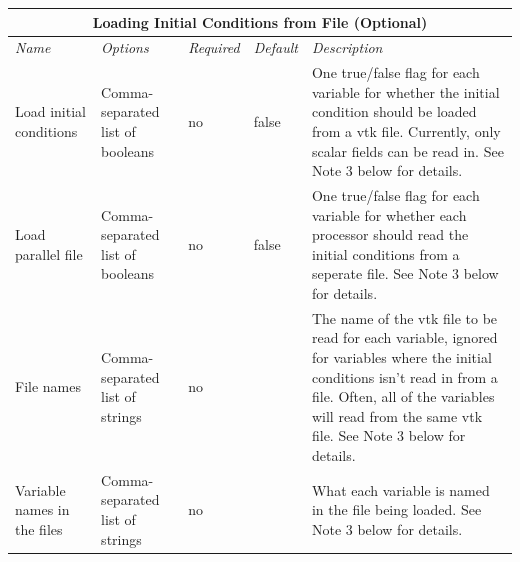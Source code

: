 \documentclass[10pt]{article} %
\begin{document}
\begin{center}
    \begin{tabular}{ | p{} | p{} | p{} | p{} | p{} |}
    \hline
      \multicolumn{5}{|c|}{\textbf{Loading Initial Conditions from File (Optional)}} \\
    \hline
    \hline
    \emph{Name} & \emph{Options} & \emph{Required} & \emph{Default} & \emph{Description} \\ \hline
    Load initial conditions & Comma-separated list of booleans & no & false & One true/false flag for each variable for whether the initial condition should be loaded from a vtk file. Currently, only scalar fields can be read in. See Note 3 below for details. \\ \hline
     Load parallel file & Comma-separated list of booleans & no & false & One true/false flag for each variable for whether each processor should read the initial conditions from a seperate file. See Note 3 below for details.  \\ \hline
      File names & Comma-separated list of strings & no &  & The name of the vtk file to be read for each variable, ignored for variables where the initial conditions isn't read in from a file. Often, all of the variables will read from the same vtk file. See Note 3 below for details.  \\ \hline
      Variable names in the files & Comma-separated list of strings & no &  & What each variable is named in the file being loaded. See Note 3 below for details.  \\ \hline
    \end{tabular}
\end{center}
\end{document}
